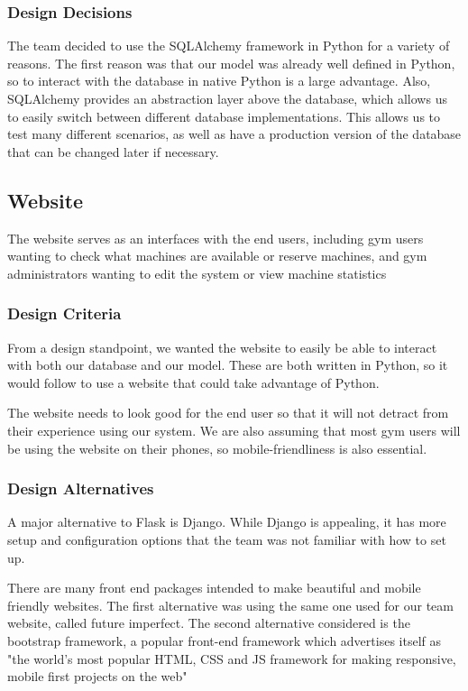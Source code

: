 \documentclass[PPFS.tex]{template/subfiles}
\begin{document}
\subsubsection{Design Decisions}
The team decided to use the SQLAlchemy framework in Python for a variety of reasons. The first reason was that our model was already well defined in Python, so to interact with the database in native Python is a large advantage. Also, SQLAlchemy provides an abstraction layer above the database, which allows us to easily switch between different database implementations. This allows us to test many different scenarios, as well as have a production version of the database that can be changed later if necessary.

\subsection{Website}
The website serves as an interfaces with the end users, including gym users wanting to check what machines are available or reserve machines, and gym administrators wanting to edit the system or view machine statistics 

\subsubsection{Design Criteria}
From a design standpoint, we wanted the website to easily be able to interact with both our database and our model. These are both written in Python, so it would follow to use a website that could take advantage of Python.

The website needs to look good for the end user so that it will not detract from their experience using our system. We are also assuming that most gym users will be using the website on their phones, so mobile-friendliness is also essential.

\subsubsection{Design Alternatives}
A major alternative to Flask is Django. While Django is appealing, it has more setup and configuration options that the team was not familiar with how to set up.

There are many front end packages intended to make beautiful and mobile friendly websites. The first alternative was using the same one used for our team website, called future imperfect.
The second alternative considered is the bootstrap framework, a popular front-end framework which advertises itself as "the world's most popular HTML, CSS and JS framework for making responsive, mobile first projects on the web"
\end{document}
